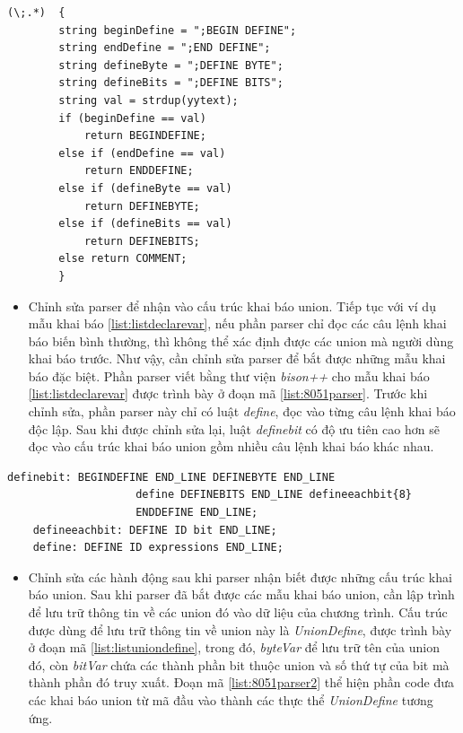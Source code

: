 \begin{changemargin}{0cm}{0cm} 
	\begin{lstlisting}[caption={Phần lexer được chỉnh sửa để nhận biết các chú thích đặc biệt},label={list:8051lexer}]
	(\;.*)  { 
		string beginDefine = ";BEGIN DEFINE";
		string endDefine = ";END DEFINE";
		string defineByte = ";DEFINE BYTE";
		string defineBits = ";DEFINE BITS";
		string val = strdup(yytext);
		if (beginDefine == val)
			return BEGINDEFINE;
		else if (endDefine == val)
			return ENDDEFINE;
		else if (defineByte == val)
			return DEFINEBYTE;
		else if (defineBits == val)
			return DEFINEBITS;
		else return COMMENT;
		}
	\end{lstlisting}

\end{changemargin} 
\begin{itemize}
	\item Chỉnh sửa parser để nhận vào cấu trúc khai báo union. Tiếp tục với ví dụ mẫu khai báo \ref{list:listdeclarevar}, nếu phần parser chỉ đọc các câu lệnh khai báo biến bình thường, thì không thể xác định được các union mà người dùng khai báo trước. Như vậy, cần chỉnh sửa parser để bắt được những mẫu khai báo đặc biệt. Phần parser viết bằng thư viện \textit{bison++} cho mẫu khai báo \ref{list:listdeclarevar} được trình bày ở đoạn mã \ref{list:8051parser}. Trước khi chỉnh sửa, phần parser này chỉ có luật \textit{define}, đọc vào từng câu lệnh khai báo độc lập. Sau khi được chỉnh sửa lại, luật \textit{definebit} có độ ưu tiên cao hơn sẽ đọc vào cấu trúc khai báo union gồm nhiều câu lệnh khai báo khác nhau.
\end{itemize}
\begin{changemargin}{0cm}{0cm} 
	\begin{lstlisting}[caption={Đoạn mã parser nhận biết các mẫu khai báo union},label={list:8051parser}]
	definebit: BEGINDEFINE END_LINE DEFINEBYTE END_LINE 
					define DEFINEBITS END_LINE defineeachbit{8} 
					ENDDEFINE END_LINE;
	defineeachbit: DEFINE ID bit END_LINE;
	define:	DEFINE ID expressions END_LINE;
	\end{lstlisting}
\end{changemargin} 
\begin{itemize}
	\item Chỉnh sửa các hành động sau khi parser nhận biết được những cấu trúc khai báo union. Sau khi parser đã bắt được các mẫu khai báo union, cần lập trình để lưu trữ thông tin về các union đó vào dữ liệu của chương trình. Cấu trúc được dùng để lưu trữ thông tin về union này là \textit{UnionDefine}, được trình bày ở đoạn mã \ref{list:listuniondefine}, trong đó, \textit{byteVar} để lưu trữ tên của union đó, còn \textit{bitVar} chứa các thành phần bit thuộc union và số thứ tự của bit mà thành phần đó truy xuất. Đoạn mã \ref{list:8051parser2} thể hiện phần code đưa các khai báo union từ mã đầu vào thành các thực thể \textit{UnionDefine} tương ứng.
\end{itemize}
